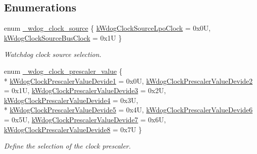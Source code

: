 \subsection*{Enumerations}
\begin{DoxyCompactItemize}
\item 
enum \hyperlink{group__wdog__hal_ga39f05d1e3aef745dad3b9e3ebd37260a}{\+\_\+wdog\+\_\+clock\+\_\+source} \{ \hyperlink{group__wdog__hal_gga39f05d1e3aef745dad3b9e3ebd37260aa90a31bf386939ee6bd642e6d2a58933e}{k\+Wdog\+Clock\+Source\+Lpo\+Clock} = 0x0U, 
\hyperlink{group__wdog__hal_gga39f05d1e3aef745dad3b9e3ebd37260aa9768e70993e1c8572672c4009a3757e0}{k\+Wdog\+Clock\+Source\+Bus\+Clock} = 0x1U
 \}\begin{DoxyCompactList}\small\item\em Watchdog clock source selection. \end{DoxyCompactList}
\item 
enum \hyperlink{group__wdog__hal_ga21b132de3ebfea46c098feb9a0ee742d}{\+\_\+wdog\+\_\+clock\+\_\+prescaler\+\_\+value} \{ \\*
\hyperlink{group__wdog__hal_gga21b132de3ebfea46c098feb9a0ee742daa63e5d740eb86f7c245f07c915c2fa53}{k\+Wdog\+Clock\+Prescaler\+Value\+Devide1} = 0x0U, 
\hyperlink{group__wdog__hal_gga21b132de3ebfea46c098feb9a0ee742da7a4a268625dcd354de43bb8747d35a11}{k\+Wdog\+Clock\+Prescaler\+Value\+Devide2} = 0x1U, 
\hyperlink{group__wdog__hal_gga21b132de3ebfea46c098feb9a0ee742dac38a35a15917cb3f95db65faa47b72e3}{k\+Wdog\+Clock\+Prescaler\+Value\+Devide3} = 0x2U, 
\hyperlink{group__wdog__hal_gga21b132de3ebfea46c098feb9a0ee742da6744bb2715cab990334bd129ca089901}{k\+Wdog\+Clock\+Prescaler\+Value\+Devide4} = 0x3U, 
\\*
\hyperlink{group__wdog__hal_gga21b132de3ebfea46c098feb9a0ee742daf2a94c736d3b2eadc5880efe413c425e}{k\+Wdog\+Clock\+Prescaler\+Value\+Devide5} = 0x4U, 
\hyperlink{group__wdog__hal_gga21b132de3ebfea46c098feb9a0ee742da9da8c0b5226b823f446bd884a2470545}{k\+Wdog\+Clock\+Prescaler\+Value\+Devide6} = 0x5U, 
\hyperlink{group__wdog__hal_gga21b132de3ebfea46c098feb9a0ee742daab7b6a6aa6a836f1bc68959ec834690e}{k\+Wdog\+Clock\+Prescaler\+Value\+Devide7} = 0x6U, 
\hyperlink{group__wdog__hal_gga21b132de3ebfea46c098feb9a0ee742daa51bba82f53dcc1587b7ebb115473840}{k\+Wdog\+Clock\+Prescaler\+Value\+Devide8} = 0x7U
 \}\begin{DoxyCompactList}\small\item\em Define the selection of the clock prescaler. \end{DoxyCompactList}
\end{DoxyCompactItemize}

